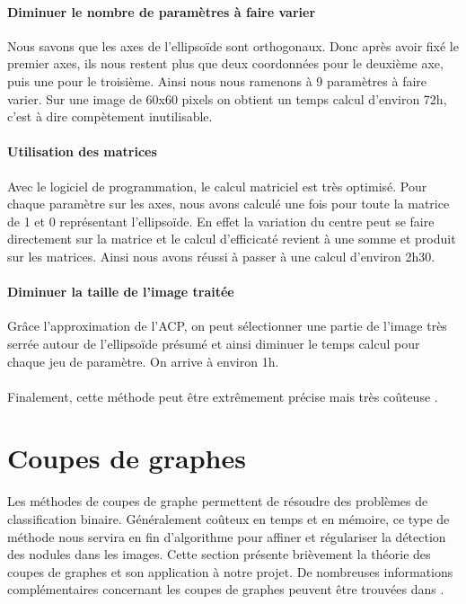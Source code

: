 \documentclass{article}
\begin{document}
\paragraph{Diminuer le nombre de paramètres à faire varier} Nous savons que les axes de l'ellipsoïde sont orthogonaux. Donc après avoir fixé le premier axes, ils nous restent plus que deux coordonnées pour le deuxième axe, puis une pour le troisième. Ainsi nous nous ramenons à 9 paramètres à faire varier. Sur une image de 60x60 pixels on obtient un temps calcul d'environ 72h, c'est à dire compètement inutilisable.

\paragraph{Utilisation des matrices} Avec le logiciel de programmation, le calcul matriciel est très optimisé. Pour chaque paramètre sur les axes, nous avons calculé une fois pour toute la matrice de 1 et 0 représentant l'ellipsoïde. En effet la variation du centre peut se faire directement sur la matrice et le calcul d'efficicaté revient à une somme et produit sur les matrices. Ainsi nous avons réussi à passer à une calcul d'environ 2h30.

\paragraph{Diminuer la taille de l'image traitée} Grâce l'approximation de l'ACP, on peut sélectionner une partie de l'image très serrée autour de l'ellipsoïde présumé et ainsi diminuer le temps calcul pour chaque jeu de paramètre. On arrive à environ 1h.\\\\

Finalement, cette méthode peut être extrêmement précise mais très coûteuse .


\section{Coupes de graphes}

Les méthodes de coupes de graphe permettent de résoudre des problèmes de classification binaire. Généralement coûteux en temps et en mémoire, ce type de méthode nous servira en fin d'algorithme pour affiner et régulariser la détection des nodules dans les images. Cette section présente brièvement la théorie des coupes de graphes et son application à notre projet. De nombreuses informations complémentaires concernant les coupes de graphes peuvent être trouvées dans \cite{bib:GC04, bib:GC05}.		
\end{document}
